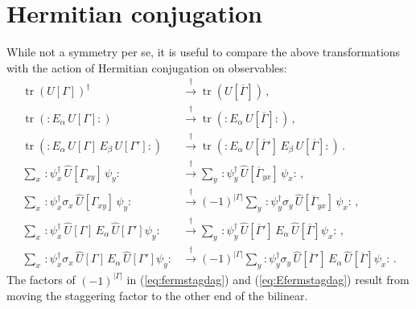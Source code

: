 \documentclass [12pt]{article}
\newcommand{\tr}{\mathop{\mathrm{tr}}}
\begin{document}
\section {Hermitian conjugation}\label{sec:HermitianConj}

While not a symmetry per se, it is useful to compare the above transformations with
the action of Hermitian conjugation on observables:
\begin{subequations}\label{eq:Hermconj}
\begin{align}
    \tr(U[\Gamma])^\dagger
    &\xrightarrow{\dagger}
    \tr(U[\overline\Gamma]) \,,
\\[3pt]
    \tr({:}E_\alpha \, U[\Gamma]{:})
    &\xrightarrow{\dagger}
    \tr({:}E_\alpha \, U[\overline\Gamma]{:}) \,,
\\[3pt]
    \tr({:}E_\alpha \, U[\Gamma] \, E_\beta \, U[\Gamma']{:})
    &\xrightarrow{\dagger}
    \tr({:}E_\alpha \, U[\overline\Gamma'] \, E_\beta \, U[\overline\Gamma]{:}) \,.
\\[5pt]
    \sum_x \,
    {:} \psi_x^\dagger \, \hat U[\Gamma_{xy}] \, \psi_y {:}
    &\xrightarrow{\dagger}
    \sum_y \,
    {:} \psi_y^\dagger \, \hat U[\overline\Gamma_{yx}] \,
	\psi_x {:} \,,
\\
    \sum_x \,
    {:} \psi_x^\dagger \sigma_x \, \hat U[\Gamma_{xy}] \, \psi_y {:}
    &\xrightarrow{\dagger}
    (-1)^{|\Gamma|}
    \sum_y \,
    {:} \psi_y^\dagger \sigma_y \, \hat U[\overline\Gamma_{yx}] \,
	\psi_x {:} \,,
\label{eq:fermstagdag}
\\
    \sum_x \,
    {:} \psi_x^\dagger \, \hat U[\Gamma] \, E_\alpha \, \hat U[\Gamma'] \psi_y {:}
    &\xrightarrow{\dagger}
    \sum_y \,
    {:} \psi_y^\dagger \, \hat U[\overline\Gamma'] \,
	E_\alpha \, \hat U[\overline\Gamma] \psi_x {:} \,,
\\
    \sum_x \,
    {:} \psi_x^\dagger \sigma_x \, \hat U[\Gamma] \, E_\alpha \, \hat U[\Gamma'] \psi_y {:}
    &\xrightarrow{\dagger}
    (-1)^{|\Gamma|}
    \sum_y
    {:} \psi_y^\dagger \sigma_y \, \hat U[\overline\Gamma'] \,
	E_\alpha \, \hat U[\overline\Gamma] \psi_x {:} \,.
\label{eq:Efermstagdag}
\end{align}
\end{subequations}
The factors of $(-1)^{|\Gamma|}$ in (\ref{eq:fermstagdag})
and (\ref{eq:Efermstagdag}) result from moving the staggering factor
to the other end of the bilinear.
\end{document}
